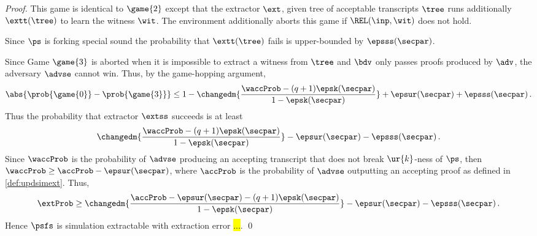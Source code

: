 \begin{proof}
	
	 This game is identical to $\game{2}$ except that the extractor $\ext$,
	given tree of acceptable transcripts $\tree$ runs additionally $\extt (\tree)$ to
	learn the witness $\wit$. The environment additionally aborts this game if
	$\REL(\inp, \wit)$ does not hold.
	
	Since $\ps$ is forking special sound the probability that $\extt(\tree)$
	fails is upper-bounded by $\epsss(\secpar)$.
	
	 Since Game $\game{3}$ is aborted when it is impossible to
	extract a witness from $\tree$ and $\bdv$ only passes proofs produced by $\adv$,
	the adversary $\advse$ cannot win. Thus, by the game-hopping argument,
	\[
	\abs{\prob{\game{0}} - \prob{\game{3}}} \leq 1 - \changedm{\frac{\waccProb - (q
			+ 1) \epsk(\secpar)}{1 - \epsk(\secpar)}} + \epsur(\secpar) +
	\epsss(\secpar)\,.
	\]
	Thus the probability that extractor $\extss$ succeeds is at least
	\[
	\changedm{\frac{\waccProb - (q + 1) \epsk(\secpar)}{1 - \epsk(\secpar)}} -
	\epsur(\secpar)
	- \epsss(\secpar)\,.
	\]
	Since $\waccProb$ is the probability of $\advse$ producing an accepting transcript
	that does not break $\ur{k}$-ness of $\ps$, then $\waccProb \geq \accProb -
	\epsur(\secpar)$, where $\accProb$ is the probability of $\advse$ outputting an accepting
	proof as defined in \cref{def:updsimext}. Thus, 
	\begin{equation}
	\label{eq:frk}
	\extProb \geq \changedm{\frac{\accProb - \epsur(\secpar) - (q + 1) \epsk(\secpar)}{1 - \epsk(\secpar)}} 
	- \epsur(\secpar) - \epsss(\secpar)\,.
	\end{equation}
	Hence $\psfs$ is simulation extractable with extraction error \hl{...}. 
	\qed
\end{proof}
